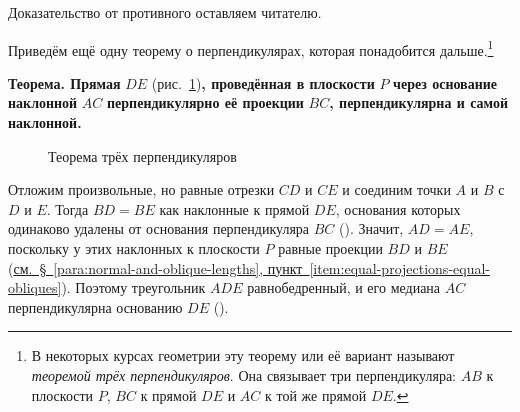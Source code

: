 Доказательство от противного оставляем читателю.

 Приведём ещё одну теорему о перпендикулярах, которая понадобится дальше.\footnote{В некоторых курсах геометрии эту теорему или её вариант называют \emph{теоремой трёх перпендикуляров}. Она связывает три перпендикуляра: \(AB\) к плоскости \(P\), \(BC\) к прямой \(DE\) и \(AC\) к той же прямой \(DE\).}

\textbf{Теорема. Прямая} \(DE\) (рис.~\ref{fig:kiselev-stereo-313})\textbf{, проведённая в плоскости} \(P\) \textbf{через основание наклонной} \(AC\) \textbf{перпендикулярно её проекции} \(BC\)\textbf{, перпендикулярна и самой наклонной.}

\begin{figure}[htbp]
    \centering
    \renewcommand{\thefigure}{313}
    \captionsetup{name=Рис.,labelsep=period}
    
    \caption{Теорема трёх перпендикуляров}\label{fig:kiselev-stereo-313}
\end{figure}

Отложим произвольные, но равные отрезки \(CD\) и \(CE\) и соединим точки \(A\) и \(B\) с \(D\) и \(E\). Тогда \(BD=BE\) как наклонные к прямой \(DE\), основания которых одинаково удалены от основания перпендикуляра \(BC\) (). Значит, \(AD=AE\), поскольку у этих наклонных к плоскости \(P\) равные проекции \(BD\) и \(BE\) (\hyperref[item:equal-projections-equal-obliques]{см.~§~\ref*{para:normal-and-oblique-lengths}, пункт~\ref*{item:equal-projections-equal-obliques}}). Поэтому треугольник \(ADE\) равнобедренный, и его медиана \(AC\) перпендикулярна основанию \(DE\) ().

\clearpage
\endgroup
